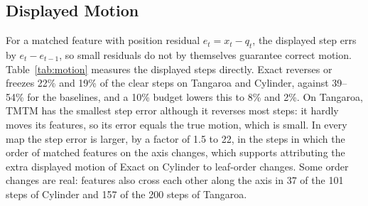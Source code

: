 \documentclass[preprint]{vgtc}
\begin{document}
\subsection{Displayed Motion}\label{sec:displayed-motion}

For a matched feature with position residual $e_t=x_t-q_t$, the displayed step errs by $e_t-e_{t-1}$, so small residuals do not by themselves guarantee correct motion. Table~\ref{tab:motion} measures the displayed steps directly. Exact reverses or freezes 22\% and 19\% of the clear steps on Tangaroa and Cylinder, against 39--54\% for the baselines, and a 10\% budget lowers this to 8\% and 2\%. On Tangaroa, TMTM has the smallest step error although it reverses most steps: it hardly moves its features, so its error equals the true motion, which is small. In every map the step error is larger, by a factor of 1.5 to 22, in the steps in which the order of matched features on the axis changes, which supports attributing the extra displayed motion of Exact on Cylinder to leaf-order changes. Some order changes are real: features also cross each other along the axis in 37 of the 101 steps of Cylinder and 157 of the 200 steps of Tangaroa.


\end{document}
